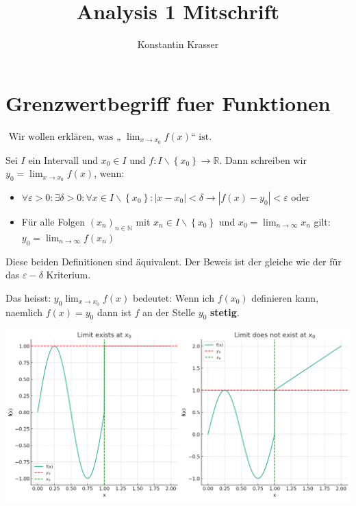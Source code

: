 \documentclass{article}
\title{Analysis 1 Mitschrift}
\author{Konstantin Krasser}
\theoremstyle{mytheoremstyle}
\theoremstyle{mytheoremstyle}
\theoremstyle{myproblemstyle}
\begin{document}
    \maketitle
    \tableofcontents
    \pagebreak
    
    \section{Grenzwertbegriff fuer Funktionen}
    $\text { Wir wollen erklären, was „ } \lim _{x \rightarrow x_0} f(x) “
    \text { ist. } $

    \begin{definition}
    Sei $I$ ein Intervall und $x_0 \in I$ und $f: I
    \backslash\left\{x_0\right\} \rightarrow \mathbb{R}$. Dann schreiben wir
    $y_0=\lim _{x \rightarrow x_0} f(x)$, wenn: \\ 
    \begin{itemize}
        \item $\forall \varepsilon>0:
        \exists \delta>0: \forall x \in I \backslash\left\{x_0\right\}:
        \left|x-x_0\right|<\delta \rightarrow\left|f(x)-y_0\right|<\varepsilon$ oder
        \item Für alle Folgen $\left(x_n\right)_{n \in \mathbb{N}}$ mit $x_n \in I
        \backslash\left\{x_0\right\}$ und $x_0=\lim _{n \rightarrow \infty} x_n$
        gilt: $y_0=\lim _{n \rightarrow \infty} f\left(x_n\right)$
    \end{itemize} 
    
    Diese beiden
    Definitionen sind äquivalent. Der Beweis ist der gleiche wie der für das
    $\varepsilon-\delta$ Kriterium.
    \end{definition}

    Das heisst: $y_0 \lim_{x \to x_0} f(x) $ bedeutet: Wenn ich $f(x_0)$ definieren kann, naemlich $f(x) = y_0$ dann ist $f$ an der Stelle $y_0$ \textbf{stetig}.

    \includegraphics[width=1\textwidth]{img:grenzwertbegriff.png}
\end{document}
